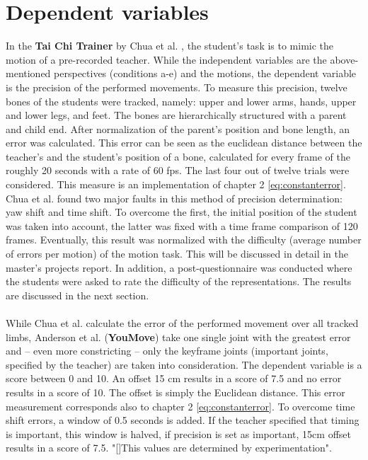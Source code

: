 \section{Dependent variables}
In the \textbf{Tai Chi Trainer} by Chua et al. \cite{Chua2003}, the student's task is to mimic the motion of a pre-recorded teacher. While the independent variables are the above-mentioned perspectives (conditions a-e) and the motions, the dependent variable is the precision of the performed movements. To measure this precision, twelve bones of the students were tracked, namely: upper and lower arms, hands, upper and lower legs, and feet. The bones are hierarchically structured with a parent and child end. After normalization of the parent's position and bone length, an error was calculated. This error can be seen as the euclidean distance between the teacher's and the student's position of a bone, calculated for every frame of the roughly 20 seconds with a rate of 60 fps. The last four out of twelve trials were considered. This measure is an implementation of chapter 2 \ref{eq:constanterror}.
Chua et al. found two major faults in this method of precision determination: yaw shift and time shift. To overcome the first, the initial position of the student was taken into account, the latter was fixed with a time frame comparison of 120 frames. Eventually, this result was normalized with the difficulty (average number of errors per motion) of the motion task. This will be discussed in detail in the master's projects report. In addition, a post-questionnaire was conducted where the students were asked to rate the difficulty of the representations. The results are discussed in the next section.\\ \\
While Chua et al. calculate the error of the performed movement over all tracked limbs, Anderson et al. (\textbf{YouMove}) take one single joint with the greatest error and \--- even more constricting \--- only the keyframe joints (important joints, specified by the teacher) are taken into consideration. The dependent variable is a score between 0 and 10. An offset 15 cm results in a score of 7.5 and no error results in a score of 10. The offset is simply the Euclidean distance. This error measurement corresponds also to chapter 2 \ref{eq:constanterror}. To overcome time shift errors, a window of 0.5 seconds is added. If the teacher specified that timing is important, this window is halved, if precision is set as important, 15cm offset results in a score of 7.5. "[]This values are determined by experimentation".\\ \\
